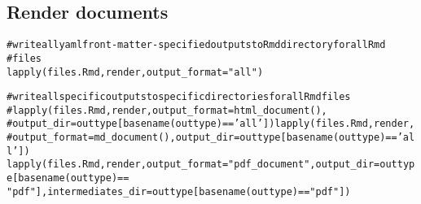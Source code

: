 \documentclass{article}\usepackage[]{graphicx}\usepackage[]{color}
\makeatletter
\newcommand{\hlstr}[1]{\textcolor[rgb]{0.863,0.196,0.184}{#1}}%
\newcommand{\hlcom}[1]{\textcolor[rgb]{0.345,0.431,0.459}{#1}}%
\newcommand{\hlopt}[1]{\textcolor[rgb]{0.576,0.631,0.631}{#1}}%
\newcommand{\hlstd}[1]{\textcolor[rgb]{0.514,0.58,0.588}{#1}}%
\newcommand{\hlkwc}[1]{\textcolor[rgb]{0.796,0.294,0.086}{#1}}%
\newcommand{\hlkwd}[1]{\textcolor[rgb]{0.576,0.631,0.631}{#1}}%
\newenvironment{kframe}{%
 \def\at@end@of@kframe{}%
 \ifinner\ifhmode%
  \def\at@end@of@kframe{\end{minipage}}%
  \begin{minipage}{\columnwidth}%
 \fi\fi%
 \def\FrameCommand##1{\hskip\@totalleftmargin \hskip-\fboxsep
 \colorbox{shadecolor}{##1}\hskip-\fboxsep
     \hskip-\linewidth \hskip-\@totalleftmargin \hskip\columnwidth}%
 \MakeFramed {\advance\hsize-\width
   \@totalleftmargin\z@ \linewidth\hsize
   \@setminipage}}%
 {\par\unskip\endMakeFramed%
 \at@end@of@kframe}
\newenvironment{knitrout}{}{} %
\makeatother
\begin{document}
\subsection{Render documents}

\begin{knitrout}
\color{fgcolor}\begin{kframe}
\begin{alltt}
\hlcom{# write all yaml front-matter-specified outputs to Rmd directory for all Rmd}
\hlcom{# files}
\hlkwd{lapply}\hlstd{(files.Rmd, render,} \hlkwc{output_format} \hlstd{=} \hlstr{"all"}\hlstd{)}

\hlcom{# write all specific outputs to specific directories for all Rmd files}
\hlcom{# lapply(files.Rmd, render, output_format=html_document(),}
\hlcom{# output_dir=outtype[basename(outtype)=='all']) lapply(files.Rmd, render,}
\hlcom{# output_format=md_document(), output_dir=outtype[basename(outtype)=='all'])}
\hlkwd{lapply}\hlstd{(files.Rmd, render,} \hlkwc{output_format} \hlstd{=} \hlstr{"pdf_document"}\hlstd{,} \hlkwc{output_dir} \hlstd{= outtype[}\hlkwd{basename}\hlstd{(outtype)} \hlopt{==}
    \hlstr{"pdf"}\hlstd{],} \hlkwc{intermediates_dir} \hlstd{= outtype[}\hlkwd{basename}\hlstd{(outtype)} \hlopt{==} \hlstr{"pdf"}\hlstd{])}
\end{alltt}
\end{kframe}
\end{knitrout}
\end{document}
